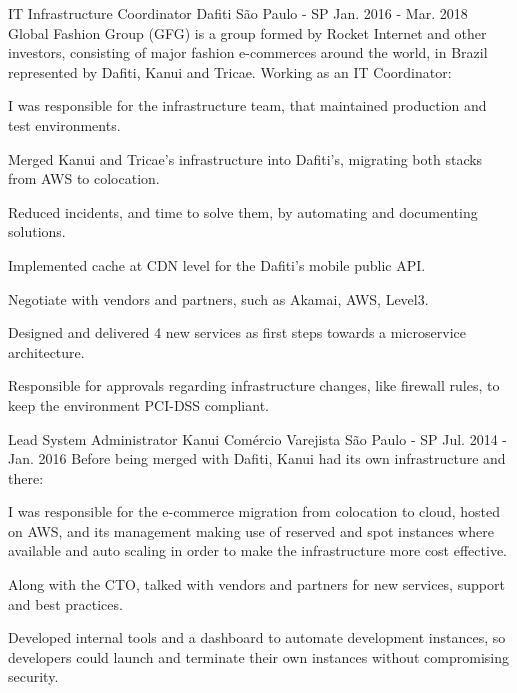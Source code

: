 \begin{cventries}
  \cventry
    {IT Infrastructure Coordinator} %
    {Dafiti} %
    {São Paulo - SP} %
    {Jan. 2016 - Mar. 2018} %
    {
      Global Fashion Group (GFG) is a group formed by Rocket Internet and other investors, consisting of major fashion
      e-commerces around the world, in Brazil represented by Dafiti, Kanui and Tricae. Working as an IT Coordinator:
    }
    {
      \begin{cvitems} %
            \item {I was responsible for the infrastructure team, that maintained production 
                  and test environments.}
            \item {Merged Kanui and Tricae’s infrastructure into Dafiti’s, migrating 
                  both stacks from AWS to colocation.}
            \item {Reduced incidents, and time to solve them, by automating and 
                  documenting solutions.}
            \item {Implemented cache at CDN level for the Dafiti’s mobile public API.}
            \item {Negotiate with vendors and partners, such as Akamai, AWS, Level3.}
            \item {Designed and delivered 4 new services as first steps towards a 
                  microservice architecture.}
            \item {Responsible for approvals regarding infrastructure changes, like 
                  firewall rules, to keep the environment PCI-DSS compliant.}
      \end{cvitems}
    }

    \cventry
      {Lead System Administrator} %
      {Kanui Comércio Varejista} %
      {São Paulo - SP} %
      {Jul. 2014 - Jan. 2016} %
      {
            Before being merged with Dafiti, Kanui had its own infrastructure and there: 
      }
      {
        \begin{cvitems} %
            \item {I was responsible for the e-commerce migration from colocation to 
                  cloud, hosted on AWS, and its management making use of reserved 
                  and spot instances where available and auto scaling in order to 
                  make the infrastructure more cost effective.}
            \item {Along with the CTO, talked with vendors and partners for new 
                  services, support and best practices.}
            \item {Developed internal tools and a dashboard to automate development 
                  instances, so developers could launch and terminate their own 
                  instances without compromising security.}
        \end{cvitems}
      }


\end{cventries}
